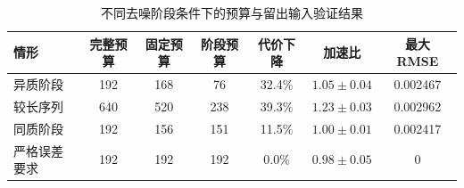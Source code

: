 \begin{table}[htbp]
    \centering
    \scriptsize
    \setlength{\tabcolsep}{4pt}
    \renewcommand\arraystretch{1.2}
    \caption{不同去噪阶段条件下的预算与留出输入验证结果}
    \label{tab:prototype_video_budget}
    \begin{tabular}{p{2.1cm}cccccc}
        \toprule
        情形 & 完整预算 & 固定预算 & 阶段预算 & 代价下降 & 加速比 & 最大 RMSE \\
        \midrule
        异质阶段 & 192 & 168 & 76 & 32.4\% & $1.05\pm0.04$ & \num{0.002467} \\
        较长序列 & 640 & 520 & 238 & 39.3\% & $1.23\pm0.03$ & \num{0.002962} \\
        同质阶段 & 192 & 156 & 151 & 11.5\% & $1.00\pm0.01$ & \num{0.002417} \\
        严格误差要求 & 192 & 192 & 192 & 0.0\% & $0.98\pm0.05$ & \num{0} \\
        \bottomrule
    \end{tabular}
\end{table}
